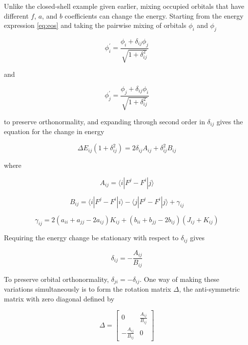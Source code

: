 Unlike the closed-shell example given earlier, mixing occupied
orbitals that have different $f$, $a$, and $b$ coefficients can change
the energy. Starting from the energy expression \ref{eq:eos} and taking the
pairwise mixing of orbitals $\phi_i$ and $\phi_j$ 

\begin{equation}
  \phi_i^\prime = \frac{\phi_i + \delta_{ij}\phi_j}
	{\sqrt{1+\delta_{ij}^2}}
\end{equation}

\noindent and

\begin{equation}
  \phi_j^\prime = \frac{\phi_j + \delta_{ij}\phi_i}
	{\sqrt{1+\delta_{ij}^2}}
\end{equation}

\noindent to preserve orthonormality, and expanding through second
order in $\delta_{ij}$ gives the equation for the change in energy

\begin{equation}
  \Delta E_{ij}(1+\delta_{ij}^2) = 2\delta_{ij}A_{ij}+
	\delta_{ij}^2B_{ij}
\label{eq:emod}
\end{equation}

\noindent where 

\begin{equation}
  A_{ij} = \langle i|F^j-F^i| j \rangle
\end{equation}

\begin{equation}
  B_{ij} = \langle i|F^j-F^i| i \rangle - \langle j|F^j-F^i| j \rangle
	+ \gamma_{ij}
\end{equation}

\begin{equation}
  \gamma_{ij} = 2(a_{ii}+a_{jj}-2a_{ij})K_{ij}
		+ (b_{ii}+b_{jj}-2b_{ij})(J_{ij}+K_{ij})
\label{eq:gamma}
\end{equation}

\noindent Requiring the energy change be stationary 
with respect to $\delta_{ij}$ gives

\begin{equation}
  \delta_{ij} = -\frac{A_{ij}}{B_{ij}}
\end{equation}

To preserve orbital orthonormality, $\delta_{ji} =
-\delta_{ij}$. One way of making these variations simultaneously is to
form the rotation matrix $\Delta$, the anti-symmetric matrix with zero
diagonal defined by

\begin{equation}
  \Delta = \left[\begin{array}{cc}
	0 & \frac{A_{ij}}{B_{ij}} \\
	-\frac{A_{ij}}{B_{ij}} & 0
	\end{array}\right]
\end{equation}

